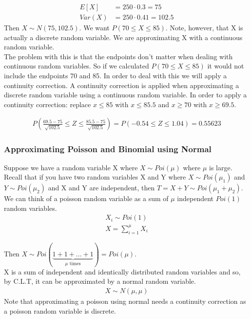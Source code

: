 \documentclass[12pt, letterpaper]{article}
\begin{document}
\begin{align*}
E[X] &= 250 \cdot 0.3 = 75\\
Var\left(X\right) &= 250 \cdot 0.41 = 102.5
\end{align*}
Then $X \sim N(75, 102.5)$. We want $P\left(70 \leq X \leq 85\right)$. Note, however, that X is actually a discrete random variable. We are approximating X with a continuous random variable.\\

The problem with this is that the endpoints don't matter when dealing with continuous random variables. So if we calculated $P\left(70 \leq X \leq 85\right)$ it would not include the endpoints 70 and 85. In order to deal with this we will apply a continuity correction. A continuity correction is applied when approximating a discrete random variable using a continuous random variable. In order to apply a continuity correction: replace $x \leq 85$ with $x \leq 85.5$ and $x \geq 70$ with $x \geq 69.5$.

\begin{align*}
P\left(\frac{69.5 - 75}{\sqrt{102.5}} \leq Z \leq \frac{85.5 - 75}{\sqrt{102.5}}\right) = P\left(-0.54 \leq Z \leq 1.04\right) = 0.55623
\end{align*}

\subsubsection{Approximating Poisson and Binomial using Normal}
Suppose we have a random variable X where $X \sim Poi(\mu)$ where $\mu$ is large.\\

Recall that if you have two random variables X and Y where $X \sim Poi(\mu_1)$ and $Y \sim Poi(\mu_2)$ and X and Y are independent, then $T = X + Y \sim Poi(\mu_1 + \mu_2)$.\\

We can think of a poisson random variable as a sum of $\mu$ independent $Poi(1)$ random variables.
\begin{align*}
X_i \sim Poi(1)\\
X = \sum_{i = 1}^{\mu} X_i 
\end{align*}

Then $X \sim Poi(\underbrace{1 + 1 + ... + 1}_\text{$\mu$ times}) = Poi(\mu)$.\\

X is a sum of independent and identically distributed random variables and so, by C.L.T, it can be approximated by a normal random variable.
\begin{align*}
X \sim N(\mu, \mu)
\end{align*}
Note that approximating a poisson using normal needs a continuity correction as a poisson random variable is discrete.\\
\end{document}
